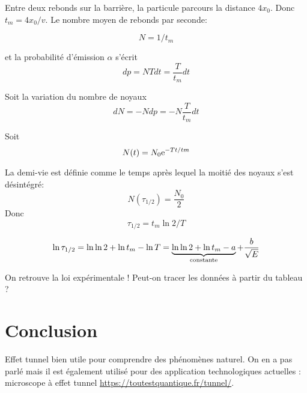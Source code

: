 \documentclass[french, a4paper, 10pt, twocolumn, landscape]{article}
\begin{document}
Entre deux rebonds sur la barrière, la particule parcours la distance $4x_0$. Donc $t_m = 4x_0/v$. Le nombre moyen de rebonds par seconde:

$$N=1/t_m$$

et la probabilité d'émission $\alpha$ s'écrit $$dp=NTdt = \dfrac{T}{t_m}dt$$

Soit la variation du nombre de noyaux $$dN=-Ndp=-N\dfrac{T}{t_m}dt$$

Soit $$N(t) = N_0{\rm e}^{-Tt/tm}$$

La demi-vie est définie comme le temps après lequel la moitié des noyaux s'est désintégré: $$N(\tau_{1/2})=\dfrac{N_0}{2}$$
Donc $$\tau_{1/2}=t_m\ln{2}/T$$

 $$\ln{\tau_{1/2}}=\ln\ln 2+\ln t_m-\ln T = \underbrace{\ln\ln 2+\ln t_m-a}_{\rm constante}+\dfrac{b}{\sqrt{E}}$$

 On retrouve la loi expérimentale !  Peut-on tracer les données à partir du tableau ? 

 \section*{Conclusion}

 Effet tunnel bien utile pour comprendre des phénomènes naturel. On en a pas parlé mais il est également utilisé pour des application technologiques actuelles : microscope à effet tunnel \url{https://toutestquantique.fr/tunnel/}.
\end{document}
